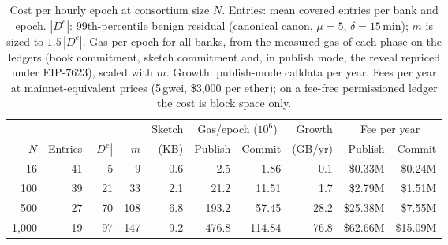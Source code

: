 \begin{table}[!htbp]\centering\small
\caption{Cost per hourly epoch at consortium size $N$. Entries: mean covered entries per bank and epoch. $|D^e|$: 99th-percentile benign residual (canonical canon, $\mu=5$, $\delta=15$\,min); $m$ is sized to $1.5\,|D^e|$. Gas per epoch for all banks, from the measured gas of each phase on the ledgers (book commitment, sketch commitment and, in publish mode, the reveal repriced under EIP-7623), scaled with $m$. Growth: publish-mode calldata per year. Fees per year at mainnet-equivalent prices (5\,gwei, \$3{,}000 per ether); on a fee-free permissioned ledger the cost is block space only.}\label{tab:scale}
\begin{adjustbox}{max width=\linewidth}\begin{tabular}{rrrrrrrrrr}\toprule
 & & & & Sketch & \multicolumn{2}{c}{Gas/epoch ($10^6$)} & Growth & \multicolumn{2}{c}{Fee per year} \\\cmidrule(lr){6-7}\cmidrule(lr){9-10}
$N$ & Entries & $|D^e|$ & $m$ & (KB) & Publish & Commit & (GB/yr) & Publish & Commit \\\midrule
16 & 41 & 5 & 9 & 0.6 & 2.5 & 1.86 & 0.1 & \$0.33M & \$0.24M \\
100 & 39 & 21 & 33 & 2.1 & 21.2 & 11.51 & 1.7 & \$2.79M & \$1.51M \\
500 & 27 & 70 & 108 & 6.8 & 193.2 & 57.45 & 28.2 & \$25.38M & \$7.55M \\
1{,}000 & 19 & 97 & 147 & 9.2 & 476.8 & 114.84 & 76.8 & \$62.66M & \$15.09M \\
\bottomrule\end{tabular}\end{adjustbox}\end{table}